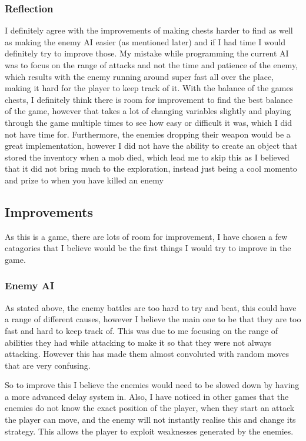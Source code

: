 \documentclass[../Main.tex]{subfiles}
\begin{document}
        \subsubsection{Reflection}
            I definitely agree with the improvements of making chests harder to find as well as making the enemy AI easier (as mentioned later) and if I had time I would definitely try to improve those. My mistake while programming the current AI was to focus on the range of attacks and not the time and patience of the enemy, which results with the enemy running around super fast all over the place, making it hard for the player to keep track of it. With the balance of the games chests, I definitely think there is room for improvement to find the best balance of the game, however that takes a lot of changing variables slightly and playing through the game multiple times to see how easy or difficult it was, which I did not have time for. Furthermore, the enemies dropping their weapon would be a great implementation, however I did not have the ability to create an object that stored the inventory when a mob died, which lead me to skip this as I believed that it did not bring much to the exploration, instead just being a cool momento and prize to when you have killed an enemy
    \subsection{Improvements}
        As this is a game, there are lots of room for improvement, I have chosen a few catagories that I believe would be the first things I would try to improve in the game.
        \subsubsection{Enemy AI}
            As stated above, the enemy battles are too hard to try and beat, this could have a range of different causes, however I believe the main one to be that they are too fast and hard to keep track of. This was due to me focusing on the range of abilities they had while attacking to make it so that they were not always attacking. However this has made them almost convoluted with random moves that are very confusing.

            So to improve this I believe the enemies would need to be slowed down by having a more advanced delay system in. Also, I have noticed in other games that the enemies do not know the exact position of the player, when they start an attack the player can move, and the enemy will not instantly realise this and change its strategy. This allows the player to exploit weaknesses generated by the enemies.
\end{document}
